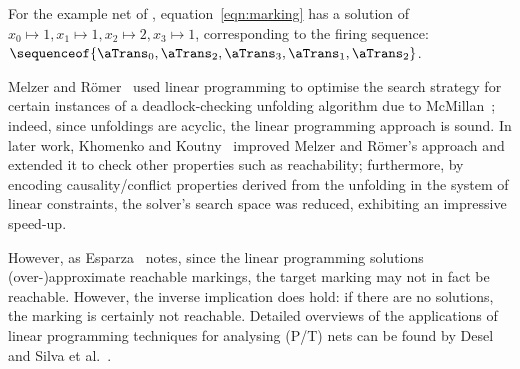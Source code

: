 For the example net of , equation~\ref{eqn:marking} has a
solution of $x_0\mapsto 1, x_1\mapsto1, x_2\mapsto2, x_3\mapsto1$,
corresponding to the firing sequence:
$\sequenceof{\aTrans_0,\aTrans_2,\aTrans_3,\aTrans_1,\aTrans_2}$.


\newcommand{\mandr}{{Melzer and R\"{o}mer}}

\mandr~\cite{Melzer1997} used linear programming to optimise the search
strategy for certain instances of a deadlock-checking unfolding algorithm due
to McMillan~\cite{McMillan1992}; indeed, since unfoldings are acyclic, the
linear programming approach is sound. In later work, {Khomenko and
Koutny}~\cite{Khomenko2000, Khomenko2007} improved \mandr's approach and
extended it to check other properties such as reachability; furthermore, by
encoding causality/conflict properties derived from the unfolding in the system
of linear constraints, the solver's search space was reduced, exhibiting
an impressive speed-up.

However, as Esparza~\cite{Esparza2000} notes, since the linear programming
solutions (over-)approximate reachable markings, the target marking may not in
fact be reachable. However, the inverse implication does hold: if there are no
solutions, the marking is certainly not reachable. Detailed overviews of the
applications of linear programming techniques for analysing (P/T) nets can be
found by {Desel}~\cite{Desel1998b} and {Silva et al.}~\cite{Silva1998}.
